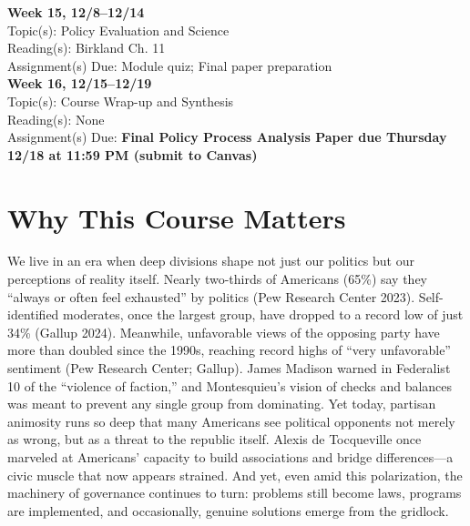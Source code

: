 \documentclass[12pt]{article}     %
\begin{document}
\noindent \textbf{Week 15, 12/8--12/14}\\
Topic(s): Policy Evaluation and Science\\
Reading(s): Birkland Ch. 11\\
Assignment(s) Due: Module quiz; Final paper preparation\\

\noindent \textbf{Week 16, 12/15--12/19}\\
Topic(s): Course Wrap-up and Synthesis\\
Reading(s): None\\
Assignment(s) Due: \textbf{Final Policy Process Analysis Paper due Thursday 12/18 at 11:59 PM (submit to Canvas)}\\

\section{Why This Course Matters}

  We live in an era when deep divisions shape not just our politics but our perceptions of reality itself. Nearly two-thirds of Americans (65\%) say they ``always or often feel exhausted'' by politics (Pew Research Center 2023). Self-identified moderates, once the largest group, have dropped to a record low of just 34\% (Gallup 2024). Meanwhile, unfavorable views of the opposing party have more than doubled since the 1990s, reaching record highs of “very unfavorable” sentiment (Pew Research Center; Gallup). James Madison warned in Federalist 10 of the “violence of faction,” and Montesquieu's vision of checks and balances was meant to prevent any single group from dominating. Yet today, partisan animosity runs so deep that many Americans see political opponents not merely as wrong, but as a threat to the republic itself. Alexis de Tocqueville once marveled at Americans' capacity to build associations and bridge differences—a civic muscle that now appears strained. And yet, even amid this polarization, the machinery of governance continues to turn: problems still become laws, programs are implemented, and occasionally, genuine solutions emerge from the gridlock.
\end{document}
